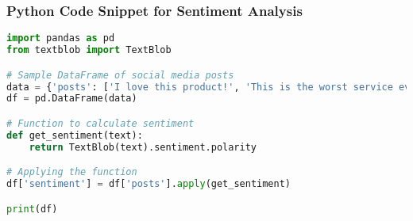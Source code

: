 \documentclass{beamer}
\begin{document}
\begin{frame}[fragile]
    \frametitle{Python Code Snippet for Sentiment Analysis}
    \begin{lstlisting}[language=Python]
import pandas as pd
from textblob import TextBlob

# Sample DataFrame of social media posts
data = {'posts': ['I love this product!', 'This is the worst service ever.', 'Satisfied with my purchase.']}
df = pd.DataFrame(data)

# Function to calculate sentiment
def get_sentiment(text):
    return TextBlob(text).sentiment.polarity

# Applying the function
df['sentiment'] = df['posts'].apply(get_sentiment)

print(df)
    \end{lstlisting}
\end{frame}
\end{document}
